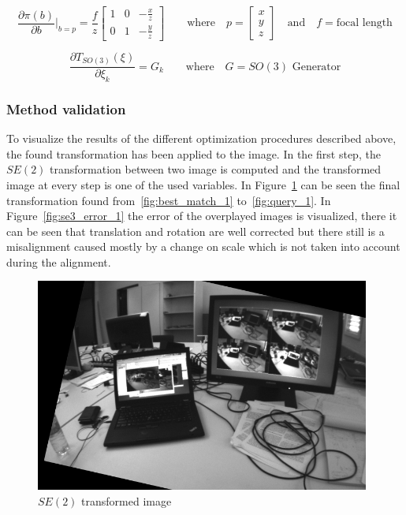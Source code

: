 \begin{equation}
  \frac{\partial \pi(b)}{\partial b} |_{b=p} = \frac{f}{z}
  \begin{bmatrix}
    1 & 0 & -\frac{x}{z} \\
    0 & 1 & -\frac{y}{z}
  \end{bmatrix}
  \qquad \text{where} \quad 
  p = \begin{bmatrix} x \\ y \\ z \end{bmatrix} \quad \text{and} \quad f = \text{focal length}
\end{equation}

\begin{equation}
  \frac{\partial T_{SO(3)}(\xi)}{\partial \xi_k}  = G_k \qquad \text{where} \quad G = \text{$SO(3)$ Generator}
\end{equation}


\subsubsection{Method validation}
\label{ssub:esm_method_validation}

To visualize the results of the different optimization procedures described above, the found transformation has been applied to the image. In the first step, the $SE(2)$ transformation between two image is computed and the transformed image at every step is one of the used variables. In Figure~\ref{fig:se2_transformation_1} can be seen the final transformation found from~\ref{fig:best_match_1} to~\ref{fig:query_1}. In Figure~\ref{fig:se3_error_1} the error of the overplayed images is visualized, there it can be seen that translation and rotation are well corrected but there still is a misalignment caused mostly by a change on scale which is not taken into account during the alignment.\\

\begin{figure}[htpb]
  \centering
  \includegraphics[width=11cm]{img/se2_transformation_1.png}
  \caption{$SE(2)$ transformed image}
  \label{fig:se2_transformation_1}
\end{figure}

